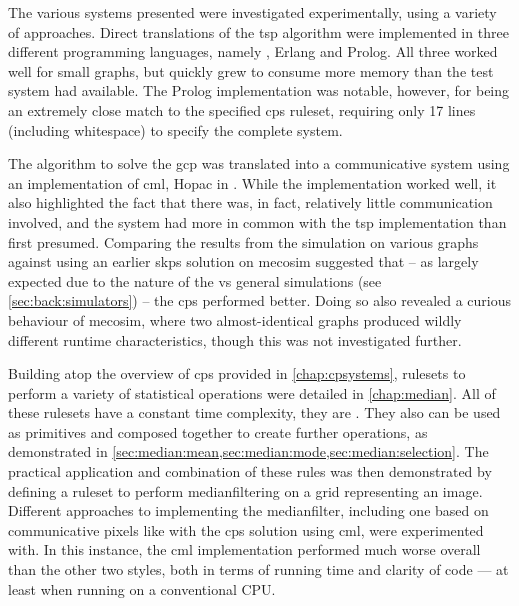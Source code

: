 The various systems presented were investigated experimentally, using a variety of approaches.  Direct translations of the \gls{tsp} algorithm were implemented in three different programming languages, namely \fsharp{}, Erlang and Prolog.  All three worked well for small graphs, but quickly grew to consume more memory than the test system had available.  The Prolog implementation was notable, however, for being an extremely close match to the specified \gls{cps} \gls{ruleset}, requiring only 17 lines (including whitespace) to specify the complete system.

The algorithm to solve the \gls{gcp} was translated into a communicative system using an implementation of \gls{cml}, Hopac in \fsharp{}.  While the implementation worked well, it also highlighted the fact that there was, in fact, relatively little communication involved, and the system had more in common with the \gls{tsp} implementation than first presumed.  Comparing the results from the simulation on various graphs against using an earlier \gls{skps} solution on \gls{mecosim} suggested that -- as largely expected due to the nature of the \adhoc{} vs general simulations (see \vref{sec:back:simulators}) -- the \gls{cps} performed better.  Doing so also revealed a curious behaviour of \gls{mecosim}, where two almost-identical graphs produced wildly different runtime characteristics, though this was not investigated further.

Building atop the overview of \gls{cps} provided in \cref{chap:cpsystems}, \glspl{ruleset} to perform a variety of statistical operations were detailed in \cref{chap:median}.  All of these rulesets have a constant time complexity, \ie{} they are .  They also can be used as primitives and composed together to create further operations, as demonstrated in \eg{} \cref{sec:median:mean,sec:median:mode,sec:median:selection}.  The practical application and combination of these rules was then demonstrated by defining a ruleset to perform \gls{medianfilter}ing on a grid representing an image.  Different approaches to implementing the \gls{medianfilter}, including one based on communicative pixels like with the \gls{cps} solution using \gls{cml}, were experimented with.  In this instance, the \gls{cml} implementation performed much worse overall than the other two styles, both in terms of running time and clarity of code --- at least when running on a conventional CPU.

